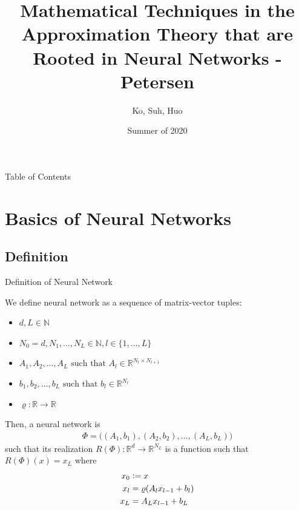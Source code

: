 \documentclass{if-beamer}
\title[Neural Networks in Approximation]{Mathematical Techniques in the Approximation Theory that are Rooted in Neural Networks - Petersen}
\author{Ko, Suh, Huo}
\institute{Georgia Tech}
\date{Summer of 2020}
\newcommand{\defeq}{\vcentcolon=}
\begin{document}
\begin{frame}
  \titlepage
\end{frame}


\begin{frame}{Table of Contents}
\tableofcontents
    
\end{frame}

\section{Basics of Neural Networks}

\subsection{Definition}
\begin{frame}{Definition of Neural Network}

\vskip 0.5cm
We define neural network as a sequence of matrix-vector tuples:
\begin{itemize}
  \item $d, L \in \mathbb{N}$
  \item $N_0 = d, N_1, \dots, N_L \in \mathbb{N}, l \in \{1,\dots,L\}$
  \item $A_1, A_2, \dots, A_L \text{ such that } A_l \in \mathbb{R}^{N_l \times N_{l+1}}$
  \item $b_1, b_2, \dots, b_L \text{ such that } b_l \in \mathbb{R}^{N_l}$
  \item $\varrho: \mathbb{R} \to \mathbb{R}$
\end{itemize}
Then, a neural network is 
\begin{align*}
    \Phi = \big((A_1,b_1),(A_2, b_2),\dots,(A_L, b_L) \big)
\end{align*}
such that its realization $R(\Phi): \mathbb{R}^d \to \mathbb{R}^{N_L}$ is a function such that $R(\Phi)(x) = x_L$ where
\begin{align*}
    x_0 &\defeq x\\
    x_l &= \varrho(A_l x_{l-1} + b_l)\\
    x_L &= A_{L} x_{l-1} + b_L
\end{align*}

\end{frame}
\end{document}
